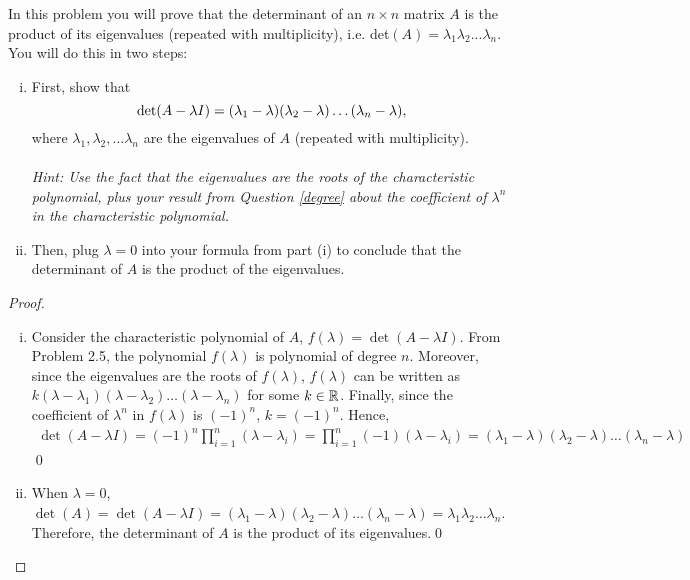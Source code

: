 \begin{question}
\normalfont In this problem you will prove that the determinant of an $n\times n$ matrix $A$ is the product of its eigenvalues (repeated with multiplicity), i.e. det$(A) =\lambda_1\lambda_2...\lambda_n$. You will do this in two steps:
\begin{enumerate}[(i)]
\item First, show that 
\[
\textup{det}(A-\lambda I) = (\lambda_1 - \lambda)(\lambda_2 - \lambda) \ldots (\lambda_n-\lambda),
\]
where $\lambda_1, \lambda_2,...\lambda_n$ are the eigenvalues of $A$ (repeated with multiplicity). \\ \\
\emph{Hint: Use the fact that the eigenvalues are the roots of the characteristic polynomial, plus your result from Question \ref{degree} about the coefficient of $\lambda^n$ in the characteristic polynomial.}

\item Then, plug $\lambda=0$ into your formula from part (i) to conclude that the determinant of $A$ is the product of the eigenvalues. 
\end{enumerate}
\end{question}

\begin{proof}
    \renewcommand{\qedsymbol}{$\blacksquare$}
    \begin{enumerate}[(i)]
        \item Consider the characteristic polynomial of $A$, $f(\lambda)=\det(A-\lambda I)$.
        From Problem 2.5, the polynomial $f(\lambda)$ is polynomial of degree $n$.
        Moreover, since the eigenvalues are the roots of $f(\lambda)$, $f(\lambda)$ can be written as $k(\lambda-\lambda_1)(\lambda-\lambda_2)\dots(\lambda-\lambda_n)$ for some $k\in\mathbb R$.
        Finally, since the coefficient of $\lambda^n$ in $f(\lambda)$ is $(-1)^n$, $k=(-1)^n$.
        Hence, 
        \[
            \begin{aligned}
                \det(A-\lambda I)=(-1)^n\prod_{i=1}^{n}(\lambda-\lambda_i)
                =\prod_{i=1}^{n}(-1)(\lambda-\lambda_i)
                =(\lambda_1-\lambda)(\lambda_2-\lambda)\dots(\lambda_n-\lambda)
            \end{aligned}
        \]\qed
        \item When $\lambda=0$, $\det(A)=\det(A-\lambda I)=(\lambda_1-\lambda)(\lambda_2-\lambda)\dots(\lambda_n-\lambda)=\lambda_1\lambda_2\dots\lambda_n$.
        Therefore, the determinant of $A$ is the product of its eigenvalues.\qed
    \end{enumerate}
    \renewcommand{\qedsymbol}{}
\end{proof}
